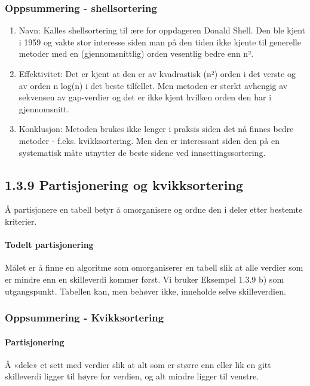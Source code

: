\documentclass[11pt]{article}
\begin{document}
        \subsubsection{Oppsummering - shellsortering}
            \begin{enumerate}
                \item Navn: Kalles shellsortering til ære for oppdageren Donald Shell. Den ble kjent i
                    1959 og vakte stor interesse siden man på den tiden ikke kjente til generelle metoder
                    med en (gjennomsnittlig) orden vesentlig bedre enn n².
                \item Effektivitet: Det er kjent at den er av kvadrastisk (n²) orden i det verste og av
                    orden n log(n) i det beste tilfellet. Men metoden er sterkt avhengig av sekvensen av
                    gap-verdier og det er ikke kjent hvilken orden den har i gjennomsnitt.
                \item Konklusjon: Metoden brukes ikke lenger i praksis siden det nå finnes bedre metoder -
                    f.eks. kvikksortering. Men den er interessant siden den på en systematisk måte utnytter
                    de beste sidene ved innsettingssortering.
            \end{enumerate}
    
    \subsection{1.3.9 Partisjonering og kvikksortering}
        Å partisjonere en tabell betyr å omorganisere og ordne den i deler etter bestemte kriterier. 

        \paragraph{Todelt partisjonering} Målet er å finne en algoritme som omorganiserer en tabell slik at
        alle verdier som er mindre enn en skilleverdi kommer først. Vi bruker Eksempel 1.3.9 b)
        som utgangspunkt. Tabellen kan, men behøver ikke, inneholde selve skilleverdien.

        \subsubsection{Oppsummering - Kvikksortering}
            \paragraph{Partisjonering}
            Å «dele» et sett med verdier slik at alt som er større
            enn eller lik en gitt skilleverdi ligger til høyre for verdien, og alt mindre ligger til
            venstre.
\end{document}
